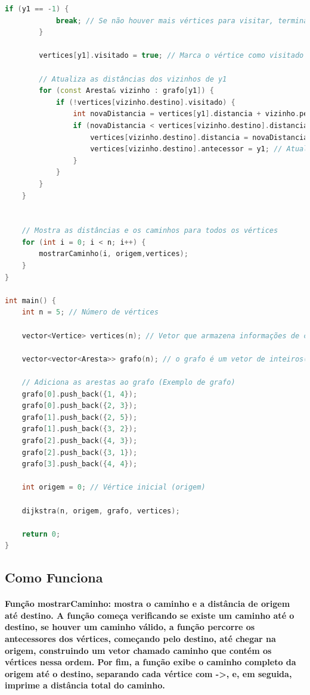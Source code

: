\documentclass{article}
\begin{document}
\begin{lstlisting}[language=c++ ,caption = Exemplo C++]
        if (y1 == -1) {
            break; // Se não houver mais vértices para visitar, termina
        }

        vertices[y1].visitado = true; // Marca o vértice como visitado

        // Atualiza as distâncias dos vizinhos de y1
        for (const Aresta& vizinho : grafo[y1]) {
            if (!vertices[vizinho.destino].visitado) {
                int novaDistancia = vertices[y1].distancia + vizinho.peso;
                if (novaDistancia < vertices[vizinho.destino].distancia) {
                    vertices[vizinho.destino].distancia = novaDistancia;
                    vertices[vizinho.destino].antecessor = y1; // Atualiza o antecessor
                }
            }
        }
    }


    // Mostra as distâncias e os caminhos para todos os vértices
    for (int i = 0; i < n; i++) {
        mostrarCaminho(i, origem,vertices);
    }
}

int main() {
    int n = 5; // Número de vértices

    vector<Vertice> vertices(n); // Vetor que armazena informações de cada vértice

    vector<vector<Aresta>> grafo(n); // o grafo é um vetor de inteiros(vertices), onde cada vertice possui um vetor de arestas

    // Adiciona as arestas ao grafo (Exemplo de grafo)
    grafo[0].push_back({1, 4});
    grafo[0].push_back({2, 3});
    grafo[1].push_back({2, 5});
    grafo[1].push_back({3, 2});
    grafo[2].push_back({4, 3});
    grafo[2].push_back({3, 1});
    grafo[3].push_back({4, 4});

    int origem = 0; // Vértice inicial (origem)

    dijkstra(n, origem, grafo, vertices);

    return 0;
}

\end{lstlisting}
\subsection{Como Funciona}

\paragraph{Função mostrarCaminho: mostra o caminho e a distância de origem até destino. A função começa verificando se existe um caminho até o destino, se houver um caminho válido, a função percorre os antecessores dos vértices, começando pelo destino, até chegar na origem, construindo um vetor chamado caminho que contém os vértices nessa ordem. Por fim, a função exibe o caminho completo da origem até o destino, separando cada vértice com ->, e, em seguida, imprime a distância total do caminho.}
\end{document}

